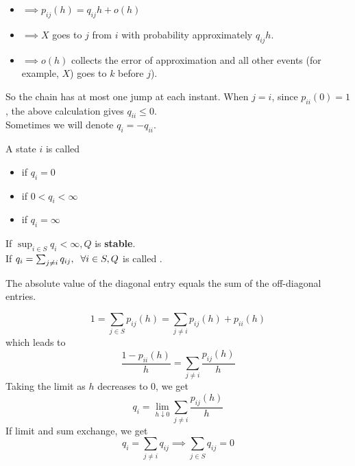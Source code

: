 \documentclass{article}
\begin{document}
        \begin{itemize}
            \item  $\implies p_{ij}(h)=q_{ij}h + o(h)$ 
            \item  $\implies X$ goes to $j$ from $i$ with probability approximately $q_{ij}h $.
            \item  $\implies o(h)$ collects the error of approximation and all other events (for example, $X$) goes to $k$ before $j$).
        \end{itemize}
        So the chain has at most one jump at each instant. When $j=i$, since $p_{ii}(0) = 1$, the above calculation gives $q_{ii} \leqslant 0$. \\
        Sometimes we will denote $q_i = - q_{ii}$.
\begin{definition}
        A state $i$ is called
        \begin{itemize}
            \item {} if $q_i = 0$
            \item {} if $0 < q_i < \infty$
            \item {} if $q_i = \infty$ 
        \end{itemize}
        If $\sup_{i \in S} q_i < \infty, Q$ is \textbf{stable}. \\
        If $q_i = \sum_{j \neq i} q_{ij}, \hspace{0.2 cm} \forall i \in S, Q $ is called .     
\end{definition}
\begin{remark}
    The absolute value of the diagonal entry equals the sum of the off-diagonal entries.
\end{remark}\begin{equation*}
    1 = \sum_{j \in S} p_{ij}(h) = \sum_{j \neq i} p_{ij}(h) + p_{ii}(h)
\end{equation*}
which leads to 
\begin{equation*}
    \frac{1-p_{ii}(h)}{h} = \sum_{j \neq i} \frac{p_{ij}(h)}{h}
\end{equation*}
Taking the limit as $h$ decreases to $0$, we get
\begin{equation*}
    q_i = \lim_{h \downarrow 0} \sum_{j \neq i} \frac{p_{ij}(h)}{h}
\end{equation*}
If limit and sum exchange, we get 
\begin{equation*}
    q_i = \sum_{j \neq i} q_{ij} \implies \sum_{j \in S} q_{ij} = 0
\end{equation*}
\end{document}
